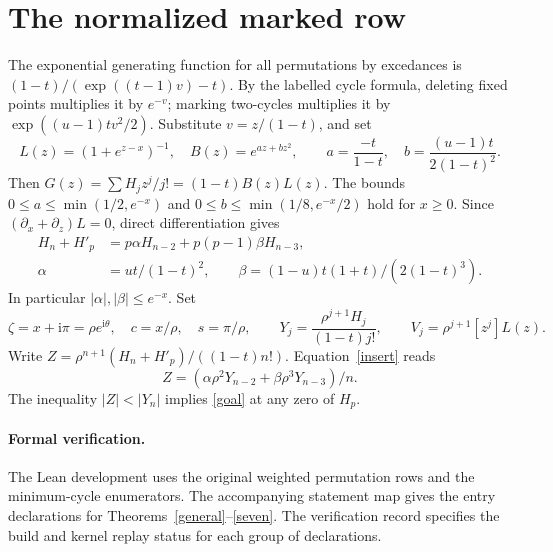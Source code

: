 \documentclass[11pt]{article}
\newcommand{\ii}{\mathrm{i}}
\begin{document}
\section{The normalized marked row}\label{sec:normalized}
The exponential generating function for all permutations by excedances is \((1-t)/(\exp((t-1)v)-t)\). By the labelled cycle formula, deleting fixed points multiplies it by \(e^{-v}\); marking two-cycles multiplies it by \(\exp((u-1)tv^2/2)\). Substitute \(v=z/(1-t)\), and set
\[
 L(z)=(1+e^{z-x})^{-1},\quad B(z)=e^{az+bz^2},\qquad
 a=\frac{-t}{1-t},\quad b=\frac{(u-1)t}{2(1-t)^2}.
\]
Then \(G(z)=\sum H_j z^j/j!=(1-t)B(z)L(z)\).
The bounds \(0\le a\le\min(1/2,e^{-x})\) and \(0\le b\le\min(1/8,e^{-x}/2)\) hold for \(x\ge0\). Since \((\partial_x+\partial_z)L=0\), direct differentiation gives
\begin{align}
 H_n+H'_p&=p\alpha H_{n-2}+p(p-1)\beta H_{n-3},\label{insert}\\
 \alpha&=ut/(1-t)^2,\qquad \beta=(1-u)t(1+t)/(2(1-t)^3).\nonumber
\end{align}
In particular \(|\alpha|,|\beta|\le e^{-x}\). Set
\[
 \zeta=x+\ii\pi=\rho e^{\ii\theta},\quad c=x/\rho,\quad s=\pi/\rho,\qquad
 Y_j=\frac{\rho^{j+1}H_j}{(1-t)j!},\qquad V_j=\rho^{j+1}[z^j]L(z).
\]
Write \(Z=\rho^{n+1}(H_n+H'_p)/((1-t)n!)\). Equation~\eqref{insert} reads
\[
 Z=(\alpha\rho^2Y_{n-2}+\beta\rho^3Y_{n-3})/n .
\]
The inequality \(|Z|<|Y_n|\) implies \eqref{goal} at any zero of \(H_p\).







\paragraph{Formal verification.}
The Lean development uses the original weighted permutation rows and the minimum-cycle enumerators. The accompanying statement map gives the entry declarations for Theorems~\ref{general}--\ref{seven}. The verification record specifies the build and kernel replay status for each group of declarations.
\end{document}
